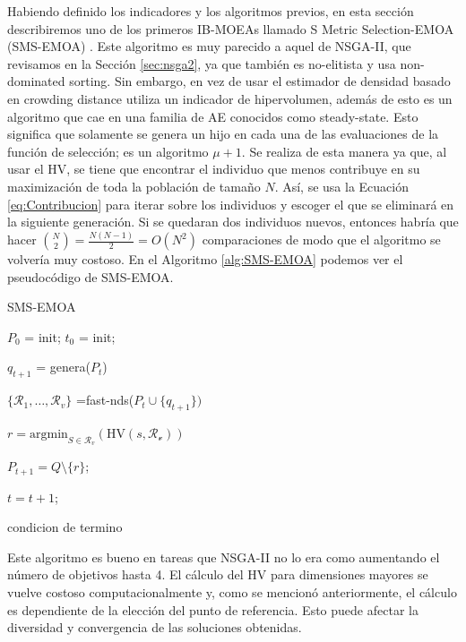 Habiendo definido los indicadores y los algoritmos previos, en esta sección describiremos uno de los primeros IB-MOEAs llamado S Metric Selection-EMOA (SMS-EMOA) \cite{SMS-EMOA}. Este algoritmo es muy parecido a aquel de NSGA-II, que revisamos en la Sección \ref{sec:nsga2}, ya que también es no-elitista y usa non-dominated sorting. Sin embargo, en vez de usar el estimador de densidad basado en crowding distance utiliza un indicador de hipervolumen, además de esto es un algoritmo que cae en una familia de AE conocidos como steady-state. Esto significa que solamente se genera un hijo en cada una de las evaluaciones de la función de selección; es un algoritmo $\mu+1$. Se realiza de esta manera ya que, al usar el HV, se tiene que encontrar el individuo que menos contribuye en su maximización de toda la población de tamaño $N$. Así, se usa la Ecuación \eqref{eq:Contribucion} para iterar sobre los individuos y escoger el que se eliminará en la siguiente generación. Si se quedaran dos individuos nuevos, entonces habría que hacer $\binom{N}{2}=\frac{N(N-1)}{2}=O(N^2)$ comparaciones de modo que el algoritmo se volvería muy costoso. En el Algoritmo \ref{alg:SMS-EMOA} podemos ver el pseudocódigo de SMS-EMOA.

\begin{algorithm}
    \caption{SMS-EMOA}\label{alg:SMS-EMOA}
    \begin{algorithmic}[1] %
        \State $P_0$ = init;
        \State $t_0$ = init;

        \Repeat
        
        $q_{t+1}$ = genera($P_t$)
        
        $\{\mathcal{R_1},\ldots,\mathcal{R}_v\}$ =fast-nds($P_t \cup \{q_{t+1}\})$
        
        $r=\text{argmin}_{S\in \mathcal{R}_v}\left( \text{HV}(s,\mathcal{R_v}) \right)$
        
        $P_{t+1}= Q \setminus \{r\}$;
        
        $t=t+1$;
        
        \Until condicion de termino

    \end{algorithmic}
\end{algorithm}

Este algoritmo es bueno en tareas que NSGA-II no lo era como aumentando el número de objetivos hasta 4. El cálculo del HV para dimensiones mayores se vuelve costoso computacionalmente y, como se mencionó anteriormente, el cálculo es dependiente de la elección del punto de referencia. Esto puede afectar la diversidad y convergencia de las soluciones obtenidas.


